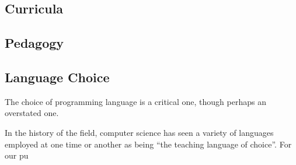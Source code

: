 \subsection{Curricula}

\subsection{Pedagogy}

\subsection{Language Choice}

The choice of programming language is a critical one, though perhaps an overstated one.  

In the history of the field, computer science has seen a variety of languages employed at one time or another as being ``the teaching language of choice''.  For our pu

